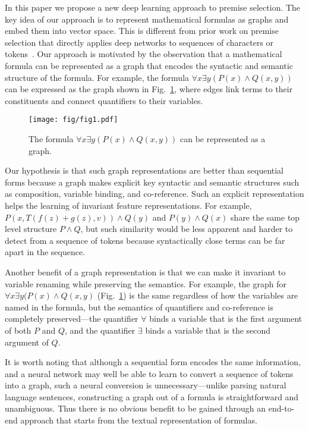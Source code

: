 \documentclass{article}
\begin{document}
In this paper we propose a new deep learning approach to premise selection. 
The key idea of our approach is to represent mathematical formulas as graphs and embed them into
vector space. This is different from prior work on premise selection that 
directly applies deep networks to sequences of characters or tokens~\cite{deepmath, holstep}. Our approach is motivated by the
observation that a mathematical formula can be represented as a graph that encodes
 the syntactic and semantic structure of the formula. For example, the
formula $\forall x \exists y (P(x) \wedge Q(x,y))  $ can be expressed as the graph shown in
Fig.~\ref{fig1}, where edges link terms to their constituents and connect quantifiers to their
variables. 

\begin{figure}
  \centering
  \texttt{[image: fig/fig1.pdf]}\\
  \caption{The formula $\forall x \exists y (P(x) \wedge Q(x,y))$ can be represented as a
    graph. }\label{fig1}
     \vspace{-2mm}
\end{figure}

Our hypothesis is that such graph representations are better than sequential
forms because a graph makes explicit key syntactic and semantic structures such as
composition, variable binding, and co-reference. Such an explicit
representation helps the learning of invariant feature representations. For
example, $P(x, T(f(z) + g(z), v)) \wedge Q(y)$ and $P(y) \wedge Q(x)$
share the same top level structure $P \wedge Q$, but such similarity would be
less apparent and harder to detect from a sequence of tokens because
syntactically close terms can be far apart in the
sequence. 

Another benefit of a graph representation is that we can make it invariant to
variable renaming while preserving the semantics. For example, the graph
for $\forall x \exists y (P(x) \wedge Q(x,y) $ 
(Fig.~\ref{fig1}) is the same regardless of how the variables are named in the formula, but the
semantics of quantifiers and co-reference is completely preserved---the quantifier $\forall$ binds a variable that
is the first argument of both $P$ and $Q$, and the quantifier $\exists$ binds a variable that is the
second argument of $Q$. 

It is worth noting that although a sequential form encodes the
same information, and a neural network may well 
 be able to learn to convert a sequence of tokens into a graph, such a neural conversion is
unnecessary---unlike parsing natural language sentences, constructing a graph out of a
formula is straightforward and unambiguous. 
Thus there is no obvious benefit to be gained through an end-to-end approach that starts
from the textual representation of formulas. 
\end{document}
